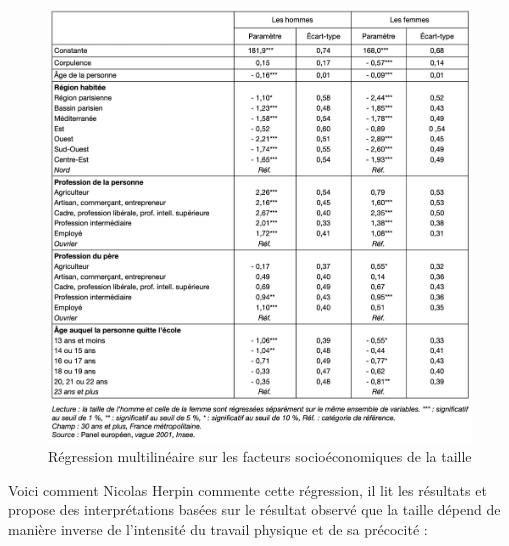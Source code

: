 \documentclass[
  french,
]{book}
\begin{document}
\begin{figure}
\includegraphics[width=18.22in]{images/herpin} \caption{Régression multilinéaire sur les facteurs socioéconomiques de la taille}\label{fig:unnamed-chunk-62}
\end{figure}

Voici comment Nicolas Herpin commente cette régression, il lit les résultats et propose des interprétations basées sur le résultat observé que la taille dépend de manière inverse de l'intensité du travail physique et de sa précocité :
\end{document}

